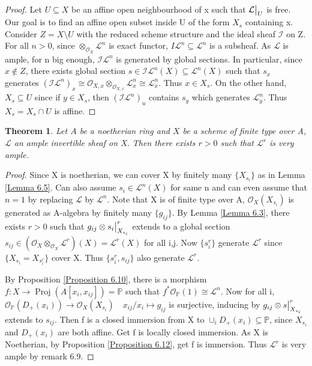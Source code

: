 \documentclass{ctexart}
\newtheorem{theorem}{Theorem}[section]
\newcommand{\proj}{\operatorname{Proj}}
\begin{document}
\begin{proof}
    Let $U \subseteq X$ be an affine open neighbourhood of x such that $\mathcal{L}\big{|}_{U}$ is free.
    Our goal is to find an affine open subset inside U of the form $X_{s}$ containing x.
    Consider $Z = X \setminus U$ with the reduced scheme structure and the ideal sheaf $\mathcal{I}$ on Z.
    For all $n > 0$, since $\otimes_{\mathcal{O}_{X}} \mathcal{L}^{n}$ is exact functor, $I\mathcal{L}^{n} \subseteq \mathcal{L}^{n}$ is a subsheaf.
    As $\mathcal{L}$ is ample, for n big enough, $\mathcal{I}\mathcal{L}^{n}$ is generated by global sections.
    In particular, since $x\notin Z$, there exists global section $s\in \mathcal{I}\mathcal{L}^{n}(X) \subseteq \mathcal{L}^{n}(X)$ such that $s_{x}$ generates $(\mathcal{I}\mathcal{L}^{n})_{x} \cong \mathcal{O}_{X, x} \otimes_{\mathcal{O}_{X, x}} \mathcal{L}_{x}^{n} \cong \mathcal{L}_{x}^{n}$.
    Thus $x\in X_{s}$.
    On the other hand, $X_{s} \subseteq U$ since if $y\in X_{s}$, then $(\mathcal{I}\mathcal{L}^{n})_{u}$ contains $s_{y}$ which generates $\mathcal{L}_{y}^{n}$.
    Thus $X_{s} = X_{s} \cap U$ is affine.
\end{proof}
\begin{theorem}
    Let $A$ be a noetherian ring and $X$ be a scheme of finite type over A, $\mathcal{L}$ an ample invertible sheaf on X.
    Then there exists $r > 0$ such that $\mathcal{L}^{r}$ is very ample.
    \label{Theorem 6.6}
\end{theorem}
\begin{proof}
    Since X is noetherian, we can cover X by finitely many $\{X_{s_{i}}\}$ as in Lemma \ref{Lemma 6.5}.
    Can also assume $s_{i}\in \mathcal{L}^{n}(X)$ for same n and can even assume that $n = 1$ by replacing $\mathcal{L}$ by $\mathcal{L}^{n}$.
    Note that X is of finite type over A, $\mathcal{O}_{X}(X_{s_{i}})$ is generated as A-algebra by finitely many $\{g_{ij}\}$.
    By Lemma \ref{Lemma 6.3}, there exists $r > 0$ such that $g_{ij} \otimes s_{i}\big{|}_{X_{s_{i}}}^{r}$ extends to a global section $s_{ij}\in (\mathcal{O}_{X} \otimes_{\mathcal{O}_{X}} \mathcal{L}^{r})(X) = \mathcal{L}^{r}(X)$ for all i,j.
    Now $\{s_{i}^{r}\}$ generate $\mathcal{L}^{r}$ since $\{X_{s_{i}} = X_{s_{i}^{r}}\}$ cover X.
    Thus $\{s_{i}^{r}, s_{ij}\}$ also generate $\mathcal{L}^{r}$.
    \par
    By Proposition \ref{Proposition 6.10}, there is a morphism $f: X \longrightarrow \proj(A[x_{i}, x_{ij}]) = \mathbb{P}$ such that $f^{\ast}\mathcal{O}_{\mathbb{P}}(1) \cong \mathcal{L}^{n}$.
    Now for all i, $\mathcal{O}_{\mathbb{P}}(D_{+}(x_{i})) \longrightarrow \mathcal{O}_{X}(X_{s_{i}})\quad x_{ij}/x_{i} \longmapsto g_{ij}$ is surjective, inducing by $g_{ij} \otimes s\big{|}_{X_{s_{i}}}^{r}$ extends to $s_{ij}$.
    Then f is a closed immersion from X to $\cup_{i} D_{+}(x_{i}) \subseteq \mathbb{P}$, since $X_{s_{i}}$ and $D_{+}(x_{i})$ are both affine.
    Get f is locally closed immersion.
    As X is Noetherian, by Proposition \ref{Proposition 6.12}, get f is immersion.
    Thus $\mathcal{L}^{r}$ is very ample by remark 6.9.
\end{proof}
\end{document}

